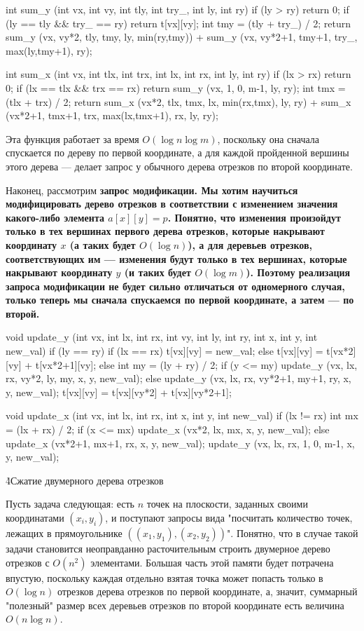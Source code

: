\code
int sum_y (int vx, int vy, int tly, int try_, int ly, int ry) {
	if (ly > ry)
		return 0;
	if (ly == tly && try_ == ry)
		return t[vx][vy];
	int tmy = (tly + try_) / 2;
	return sum_y (vx, vy*2, tly, tmy, ly, min(ry,tmy))
		+ sum_y (vx, vy*2+1, tmy+1, try_, max(ly,tmy+1), ry);
}

int sum_x (int vx, int tlx, int trx, int lx, int rx, int ly, int ry) {
	if (lx > rx)
		return 0;
	if (lx == tlx && trx == rx)
		return sum_y (vx, 1, 0, m-1, ly, ry);
	int tmx = (tlx + trx) / 2;
	return sum_x (vx*2, tlx, tmx, lx, min(rx,tmx), ly, ry)
		+ sum_x (vx*2+1, tmx+1, trx, max(lx,tmx+1), rx, ly, ry);
}
\endcode

Эта функция работает за время $O (\log n \log m)$, поскольку она сначала спускается по дереву по первой координате, а для каждой пройденной вершины этого дерева --- делает запрос у обычного дерева отрезков по второй координате.

Наконец, рассмотрим \bf{запрос модификации}. Мы хотим научиться модифицировать дерево отрезков в соответствии с изменением значения какого-либо элемента $a[x][y] = p$. Понятно, что изменения произойдут только в тех вершинах первого дерева отрезков, которые накрывают координату $x$ (а таких будет $O (\log n)$), а для деревьев отрезков, соответствующих им --- изменения будут только в тех вершинах, которые накрывают координату $y$ (и таких будет $O (\log m)$). Поэтому реализация запроса модификации не будет сильно отличаться от одномерного случая, только теперь мы сначала спускаемся по первой координате, а затем --- по второй.

\code
void update_y (int vx, int lx, int rx, int vy, int ly, int ry, int x, int y, int new_val) {
	if (ly == ry) {
		if (lx == rx)
			t[vx][vy] = new_val;
		else
			t[vx][vy] = t[vx*2][vy] + t[vx*2+1][vy];
	}
	else {
		int my = (ly + ry) / 2;
		if (y <= my)
			update_y (vx, lx, rx, vy*2, ly, my, x, y, new_val);
		else
			update_y (vx, lx, rx, vy*2+1, my+1, ry, x, y, new_val);
		t[vx][vy] = t[vx][vy*2] + t[vx][vy*2+1];
	}
}

void update_x (int vx, int lx, int rx, int x, int y, int new_val) {
	if (lx != rx) {
		int mx = (lx + rx) / 2;
		if (x <= mx)
			update_x (vx*2, lx, mx, x, y, new_val);
		else
			update_x (vx*2+1, mx+1, rx, x, y, new_val);
	}
	update_y (vx, lx, rx, 1, 0, m-1, x, y, new_val);
}
\endcode

\h4{Сжатие двумерного дерева отрезков}

Пусть задача следующая: есть $n$ точек на плоскости, заданных своими координатами $(x_i,y_i)$, и поступают запросы вида "посчитать количество точек, лежащих в прямоугольнике $((x_1,y_1),(x_2,y_2))$". Понятно, что в случае такой задачи становится неоправданно расточительным строить двумерное дерево отрезков с $O (n^2)$ элементами. Большая часть этой памяти будет потрачена впустую, поскольку каждая отдельно взятая точка может попасть только в $O (\log n)$ отрезков дерева отрезков по первой координате, а, значит, суммарный "полезный" размер всех деревьев отрезков по второй координате есть величина $O (n \log n)$.

